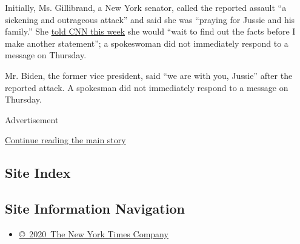 Initially, Ms. Gillibrand, a New York senator, called the reported
assault ``a sickening and outrageous attack'' and said she was ``praying
for Jussie and his family.'' She
\href{https://twitter.com/DJJudd/status/1097723633605267456?ref_src=twsrc\%5Etfw\%7Ctwcamp\%5Etweetembed\%7Ctwterm\%5E1097723633605267456\&ref_url=https\%3A\%2F\%2Fwww.redstate.com\%2Fsister-toldjah\%2F2019\%2F02\%2F21\%2Fpass-the-ranch-gillibrand-statement-jussie-worst-yet\%2F}{told
CNN this week} she would ``wait to find out the facts before I make
another statement''; a spokeswoman did not immediately respond to a
message on Thursday.

Mr. Biden, the former vice president, said ``we are with you, Jussie''
after the reported attack. A spokesman did not immediately respond to a
message on Thursday.

Advertisement

\protect\hyperlink{after-bottom}{Continue reading the main story}

\hypertarget{site-index}{%
\subsection{Site Index}\label{site-index}}

\hypertarget{site-information-navigation}{%
\subsection{Site Information
Navigation}\label{site-information-navigation}}

\begin{itemize}
\tightlist
\item
  \href{https://help.nytimes3xbfgragh.onion/hc/en-us/articles/115014792127-Copyright-notice}{©~2020~The
  New York Times Company}
\end{itemize}

